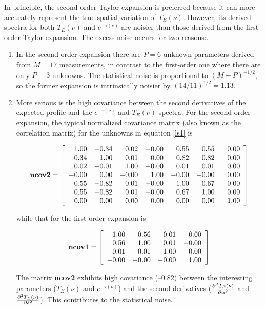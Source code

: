 \documentclass[12pt,preprint]{aastex}
\begin{document}
In principle, the second-order Taylor expansion is preferred because it
can more accurately represent the true spatial variation of
$T_E(\nu)$. However, its derived spectra for both $T_E(\nu)$ and 
$e^{-\tau (\nu)}$ are noisier than those derived from the first-order
Taylor expansion. The excess noise occurs for two
reasons:. \begin{enumerate}

\item In the second-order expansion there are $P=6$ unknown parameters
  derived from $M=17$ measurements, in contrast to the first-order one
  where there are only $P=3$ unknowns. The statistical noise is
  proportional to $(M-P)^{-1/2}$, so the former expansion is
  intrinsically noisier by $(14/11)^{1/2} = 1.13$. 

\item More serious is the high covariance between the second derivatives
  of the expected profile and the $e^{-\tau (\nu)}$ and $T_{E}(\nu)$
  spectra. For the second-order expansion, the typical normalized
  covariance matrix (also known as the correlation matrix) for the
  unknowns in equation \ref{ls1} is

\begin{eqnarray} \label{ncov2}
{\bf ncov2} = \left[
\begin{array}{rrrrrrr}
  1.00 & -0.34  & 0.02 & -0.00 &  0.55 &  0.55 &  0.00 \\
 -0.34 &  1.00 & -0.01 &  0.00 & -0.82 & -0.82 & -0.00 \\
  0.02 & -0.01  & 1.00 & -0.00 &  0.01 &  0.01 &  0.00 \\
 -0.00 &  0.00  & -0.00 &  1.00 & -0.00 & -0.00 &  0.00 \\
  0.55 & -0.82  & 0.01 & -0.00 &  1.00 &  0.67 &  0.00 \\
  0.55 & -0.82  & 0.01 & -0.00 &  0.67 &  1.00 &  0.00 \\
  0.00 & -0.00  & 0.00 &  0.00 &  0.00 &  0.00 &  1.00 
\end{array}
\right]
\end{eqnarray} 

\noindent while that for the first-order expansion is

\begin{eqnarray} \label{ncov1}
{\bf ncov1} = \left[
\begin{array}{rrrr}
  1.00 &  0.56 &  0.01 & -0.00 \\
  0.56 &  1.00 &  0.01 & -0.00 \\
  0.01 &  0.01 &  1.00 & -0.00 \\
 -0.00 & -0.00 & -0.00 &  1.00 
\end{array}
\right]
\end{eqnarray} 

\noindent The matrix {\bf ncov2} exhibits high covariance (--0.82)
between the interesting parameters ($T_E(\nu)$ and $e^{-\tau (\nu)}$)
and the second derivatives ($\partial^2 T_{E}(\nu) \over \partial
\alpha^2$ and $\partial^2 T_{E}(\nu) \over \partial \delta^2$). This
contributes to the statistical noise.

\end{enumerate}
\end{document}
